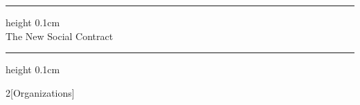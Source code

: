 \begin{titlepage}
	\begin{center}
		{
            \vspace*{2cm}
            \hrule height 0.1cm \leavevmode \\[0.5cm]
			\Huge The New Social Contract\\[1.25cm]
            \hrule height 0.1cm \leavevmode \\[0.5cm]
		}
        \vspace{1cm}
		{
            \begin{multicols}{2}[Organizations]
                \\[0.5cm]
                \blindtext\blindtext
            \end{multicols}
		}
	\end{center}
\end{titlepage}